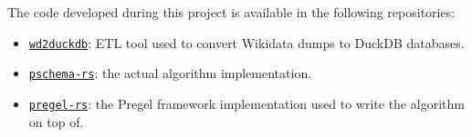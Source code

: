 The code developed during this project is available in the following repositories:

\begin{itemize}
    \itemsep0.25em
    \item \href{https://github.com/angelip2303/wd2duckdb}{\texttt{wd2duckdb}}: ETL tool used to convert Wikidata dumps to DuckDB databases.
    \item \href{https://github.com/angelip2303/pschema-rs}{\texttt{pschema-rs}}: the actual algorithm implementation.
    \item \href{https://github.com/angelip2303/pregel-rs}{\texttt{pregel-rs}}: the Pregel framework implementation used to write the algorithm on top of.
\end{itemize}
